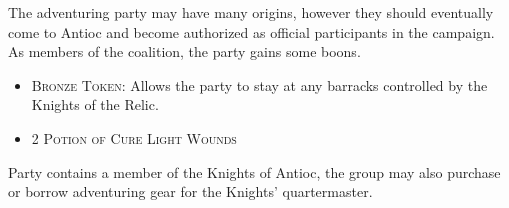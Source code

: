 The adventuring party may have many origins, however they should eventually 
come to Antioc and become authorized as official participants in the campaign.
As members of the coalition, the party gains some boons.

	\begin{itemize}
		\item \textsc{Bronze Token}: Allows the party to stay at any
			barracks controlled by the Knights of the Relic.
		\item 2 \textsc{Potion of Cure Light Wounds}
	\end{itemize}

Party contains a member of the Knights of Antioc, the group may also purchase
or borrow adventuring gear for the Knights' quartermaster.  

